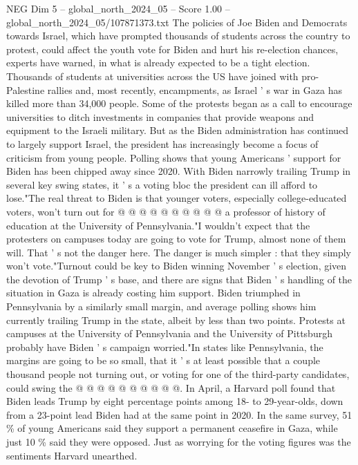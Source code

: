 \begin{textsample}{NEG Dim 5 – global\_north\_2024\_05 – Score 1.00 – global\_north\_2024\_05/107871373.txt}  \label{ex:f5_neg_290}
The policies of Joe Biden and Democrats towards Israel, which have prompted thousands of students across the country to protest, could affect the youth vote for Biden and hurt his re-election chances, experts have warned, in what is already expected to be a tight election.
Thousands of students at universities across the US have joined with pro-Palestine rallies and, most recently, encampments, as Israel ' s war in Gaza has killed more than 34,000 people.
Some of the protests began as a call to encourage universities to ditch investments in companies that provide weapons and equipment to the Israeli military.
But as the Biden administration has continued to largely support Israel, the president has increasingly become a focus of criticism from young people.
Polling shows that young Americans ' support for Biden has been chipped away since 2020.
With Biden narrowly trailing Trump in several key swing states, it ' s a voting bloc the president can ill afford to lose."The real threat to Biden is that younger voters, especially college-educated voters, won't turn out for @ @ @ @ @ @ @ @ @ @ a professor of history of education at the University of Pennsylvania."I wouldn't expect that the protesters on campuses today are going to vote for Trump, almost none of them will.
That ' s not the danger here.
The danger is much simpler : that they simply won't vote."Turnout could be key to Biden winning November ' s election, given the devotion of Trump ' s base, and there are signs that Biden ' s handling of the situation in Gaza is already costing him support.
Biden triumphed in Pennsylvania by a similarly small margin, and average polling shows him currently trailing Trump in the state, albeit by less than two points.
Protests at campuses at the University of Pennsylvania and the University of Pittsburgh probably have Biden ' s campaign worried."In states like Pennsylvania, the margins are going to be so small, that it ' s at least possible that a couple thousand people not turning out, or voting for one of the third-party candidates, could swing the @ @ @ @ @ @ @ @ @ @.
In April, a Harvard poll found that Biden leads Trump by eight percentage points among 18- to 29-year-olds, down from a 23-point lead Biden had at the same point in 2020.
In the same survey, 51 \% of young Americans said they support a permanent ceasefire in Gaza, while just 10 \% said they were opposed.
Just as worrying for the voting figures was the sentiments Harvard unearthed.

\end{textsample}
